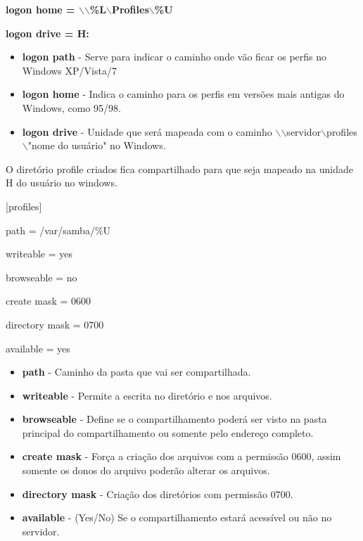 \textbf {logon home = $\backslash$$\backslash$\%L$\backslash$Profiles$\backslash$\%U}

\textbf	{logon drive = H:}

\begin{itemize}
	\item \textbf{logon path} - Serve para indicar o caminho onde vão ficar os perfis no Windows XP/Vista/7 
	\item \textbf{logon home} - Indica o caminho para os perfis em versões mais antigas do Windows, como 95/98.
	\item \textbf{logon drive} - Unidade que será mapeada com o caminho $\backslash$$\backslash$servidor$\backslash$profiles$\backslash$"nome do usuário" no Windows.
\end{itemize}





O diretório profile criados fica compartilhado para que seja mapeado na unidade H do usuário no windows.

[profiles] 

	path = /var/samba/\%U 
	
	writeable = yes 
	
	browseable = no 
	
	create mask = 0600 
	
	directory mask = 0700 
	
	available = yes 

\begin{itemize}
	\item \textbf {path} - Caminho da pasta que vai ser compartilhada.
	\item \textbf {writeable} - Permite a escrita no diretório e nos arquivos.
	\item \textbf {browseable} - Define se o compartilhamento poderá ser visto na pasta principal do compartilhamento ou somente pelo endereço completo.
	\item \textbf {create mask} - Força a criação dos arquivos com a permissão 0600, assim somente os donos do arquivo poderão alterar os arquivos.
	\item \textbf {directory mask} - Criação dos diretórios com permissão 0700.
	\item \textbf{available} - (Yes/No) Se o compartilhamento estará acessível ou não no servidor.
\end{itemize}


